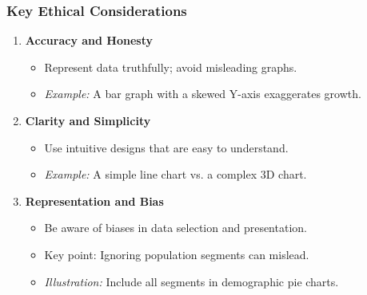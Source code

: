 \documentclass[aspectratio=169]{beamer}
\begin{document}
\begin{frame}[fragile]
  \frametitle{Key Ethical Considerations}
  \begin{enumerate}
    \item \textbf{Accuracy and Honesty}
      \begin{itemize}
        \item Represent data truthfully; avoid misleading graphs.
        \item \textit{Example:} A bar graph with a skewed Y-axis exaggerates growth.
      \end{itemize}
      
    \item \textbf{Clarity and Simplicity}
      \begin{itemize}
        \item Use intuitive designs that are easy to understand.
        \item \textit{Example:} A simple line chart vs. a complex 3D chart.
      \end{itemize}
    
    \item \textbf{Representation and Bias}
      \begin{itemize}
        \item Be aware of biases in data selection and presentation.
        \item Key point: Ignoring population segments can mislead.
        \item \textit{Illustration:} Include all segments in demographic pie charts.
      \end{itemize}
  \end{enumerate}
\end{frame}
\end{document}
